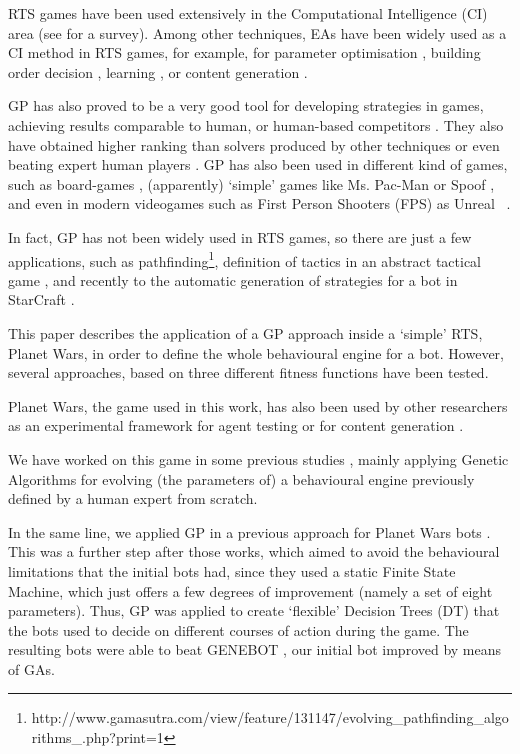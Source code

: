 \documentclass[preprint]{elsarticle}
\begin{document}
RTS games have been used extensively in the Computational Intelligence (CI) area (see \cite{Lara2013review} for a survey). 
Among other techniques, EAs have been widely used as a CI method in RTS games, for example, for parameter optimisation \cite{Genebot_CEC11,ExpGenebot_CIG2012}, building order decision \cite{Kostler2013:MO_StarCraftII,Barriga2014:BuildingOrder_GA}, learning \cite{learning_StarCraft_AAIDE11,Wender_RL_CIG12}, or content generation \cite{Mahlmann2012MapGeneration,Lara_EntComp_PCG_RTS14}. 

GP has also proved to be a very good tool for developing strategies in
games, achieving results comparable to human, or human-based
competitors \cite{Sipper2007gameplaying}. They also have obtained
higher ranking than solvers produced by other techniques or even
beating expert human players \cite{Elyasaf2012FreeCell}. GP has also
been used in different kind of games, such as board-games
\cite{Benbassat2012Reversi}, (apparently) `simple' games like
Ms. Pac-Man \cite{Brandstetter2012PacMan} or Spoof
\cite{Wittkamp2007spoof}, and even in modern videogames such as First
Person Shooters (FPS) as Unreal\texttrademark~
\cite{Mora_UnrealBots10,Esparcia2013GPunreal}. 

In fact, GP has not been widely used in RTS games, so
there are just a few applications, such as pathfinding\footnote{http://www.gamasutra.com/view/feature/131147/evolving\_pathfinding\_algorithms\_.php?print=1}, definition of tactics in an abstract
tactical game \cite{KeaveneyO09_GP_RTS}, and recently to the automatic generation of strategies for a bot in StarCraft \cite{Garcia15Starcraft}.

This paper describes the application of a GP approach inside a `simple' RTS, Planet Wars, in order to define the whole behavioural engine for a bot. However, several approaches, based on three different fitness functions have been tested.
 
Planet Wars, the game used in this work, has also been used by other researchers
as an experimental framework for agent testing \cite{ZiolkoK12_PW_Reasoning} or for content generation \cite{Lara-CabreraCCL15}. 

We have worked on this game in some previous studies
\cite{Genebot_CEC11,genebot-evo12,Co-Genebot_EVO2014}, mainly applying
Genetic Algorithms for evolving (the parameters of) a behavioural
engine previously defined by a human expert from scratch.   

In the same line, we applied GP in a previous approach for Planet Wars bots
\cite{Garcia14Treedepth}. This was a further step after those works, which aimed to avoid the behavioural limitations that the initial bots had, since they used a static Finite State Machine, which just offers a
few degrees of improvement (namely a set of eight parameters). 
Thus, GP was applied to create `flexible' Decision Trees (DT) that the bots
used to decide on different courses of action during the game. 
The resulting bots were able to beat GENEBOT \cite{Genebot_CEC11}, our initial bot improved by means of GAs.
\end{document}
